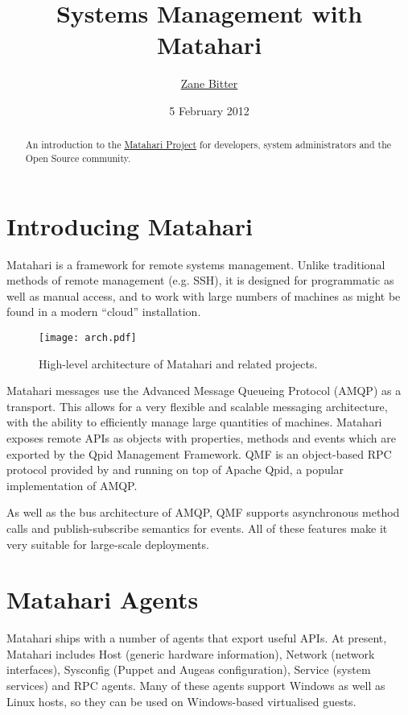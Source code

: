 \documentclass{tufte-handout}
\title{Systems Management with Matahari}
\author{\href{mailto:zbitter@redhat.com}{Zane Bitter}}
\date{5 February 2012}
\begin{document}
\maketitle

\marginnote{\tableofcontents \vspace{2em}}

\begin{abstract}
An introduction to the \href{http://matahariproject.org}{Matahari Project} for developers, system administrators and the Open Source community.
\end{abstract}

\section{Introducing Matahari}

Matahari is a framework for remote systems management. Unlike traditional methods of remote management (e.g. SSH), it is designed for programmatic as well as manual access, and to work with large numbers of machines as might be found in a modern ``cloud'' installation.

\begin{figure*}[b!]
\texttt{[image: arch.pdf]}
\caption{High-level architecture of Matahari and related projects.}
\label{fig:arch}
\end{figure*}

Matahari messages use the Advanced Message Queueing Protocol (AMQP) as a transport. This allows for a very flexible and scalable messaging architecture, with the ability to efficiently manage large quantities of machines.
Matahari exposes remote APIs as objects with properties, methods and events which are exported by the Qpid Management Framework. QMF is an object-based RPC protocol provided by and running on top of Apache Qpid, a popular implementation of AMQP.

As well as the bus architecture of AMQP, QMF supports asynchronous method calls and publish-subscribe semantics for events. All of these features make it very suitable for large-scale deployments.

\section{Matahari Agents}

Matahari ships with a number of agents that export useful APIs. At present, Matahari includes Host (generic hardware information), Network (network interfaces), Sysconfig (Puppet and Augeas configuration), Service (system services) and RPC agents.
Many of these agents support Windows as well as Linux hosts, so they can be used on Windows-based virtualised guests.
\end{document}
